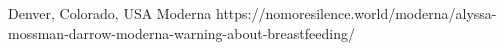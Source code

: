           {Denver, Colorado, USA}
          {}
          {Moderna}
          {}
          {
          }
          {https://nomoresilence.world/moderna/alyssa-mossman-darrow-moderna-warning-about-breastfeeding/}

